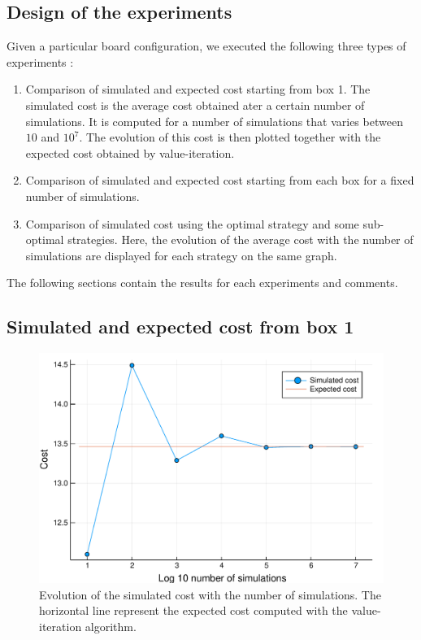 \subsection{Design of the experiments}
Given a particular board configuration, we executed the following three types of experiments : 
\begin{enumerate}
	\item Comparison of simulated and expected cost starting from box 1.
	The simulated cost is the average cost obtained ater a certain number of simulations.
	It is computed for a number of simulations that varies between $10$ and $10^7$. 
	The evolution of this cost is then plotted together with the expected cost obtained by value-iteration.
	\item Comparison of simulated and expected cost starting from each box for a fixed number of simulations.
	\item Comparison of simulated cost using the optimal strategy and some sub-optimal strategies. 
	Here, the evolution of the average cost  with the number of simulations are displayed for each strategy on the same graph.
\end{enumerate}
The following sections contain the results for each experiments and comments.

\subsection{Simulated and expected cost from box 1}
\begin{figure}
\centering
\includegraphics[scale=0.41]{../img/board_unif_low/cost_iterations_log.pdf}
\caption{Evolution of the simulated cost with the number of simulations. The horizontal line represent the expected cost computed with the value-iteration algorithm.}
\label{fig:cost_iterations_log}
\end{figure}


